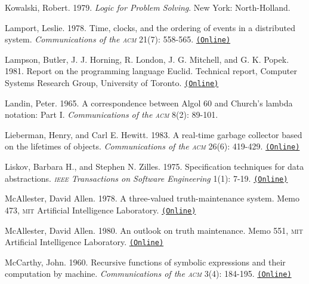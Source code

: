\documentclass[8pt,oneside]{book}
\newcommand{\acronym}[1]{\textsc{\MakeLowercase{#1}}}
\newcommand{\code}[1]{\texttt{#1}}
\begin{document}
Kowalski, Robert.  1979.  \textit{Logic for Problem Solving}. New York:
North-Holland.

 \label{Lamport (1978)}
Lamport, Leslie. 1978.  Time, clocks, and the ordering of events in a
distributed system.  \textit{Communications of the \acronym{ACM}} 21(7): 558-565.
\href{http://www.stanford.edu/class/cs240/readings/lamport.pdf}{\code{(Online)}}

 \label{Lampson et al. 1981}
Lampson, Butler, J. J. Horning, R.  London, J. G. Mitchell, and G. K.  Popek.
1981.  Report on the programming language Euclid.  Technical report, Computer
Systems Research Group, University of Toronto.
\href{http://www.bitsavers.org/pdf/xerox/parc/techReports/CSL-81-12_Report_On_The_Programming_Language_Euclid.pdf}{\code{(Online)}}

 \label{Landin (1965)}
Landin, Peter.  1965.  A correspondence between Algol 60 and Church's lambda
notation: Part I.  \textit{Communications of the \acronym{ACM}} 8(2): 89-101.

 \label{Lieberman and Hewitt 1983}
Lieberman, Henry, and Carl E. Hewitt. 1983. A real-time garbage collector based
on the lifetimes of objects. \textit{Communications of the \acronym{ACM}}
26(6): 419-429.
\href{http://dspace.mit.edu/handle/1721.1/6335}{\code{(Online)}}

 \label{Liskov and Zilles (1975)}
Liskov, Barbara H., and Stephen N. Zilles.  1975.  Specification techniques for
data abstractions.  \textit{\acronym{IEEE} Transactions on Software Engineering}
1(1): 7-19.
\href{http://csg.csail.mit.edu/CSGArchives/memos/Memo-117.pdf}{\code{(Online)}}

 \label{McAllester (1978; 1980)}
McAllester, David Allen.  1978.  A three-valued truth-maintenance system.  Memo
473, \acronym{MIT} Artificial Intelligence Laboratory.
\href{http://dspace.mit.edu/handle/1721.1/6296}{\code{(Online)}}

McAllester, David Allen.  1980.  An outlook on truth maintenance.  Memo 551,
\acronym{MIT} Artificial Intelligence Laboratory.
\href{http://dspace.mit.edu/handle/1721.1/6327}{\code{(Online)}}

 \label{McCarthy 1960}
McCarthy, John.  1960.  Recursive functions of symbolic expressions and their
computation by machine.  \textit{Communications of the \acronym{ACM}}
3(4): 184-195.
\href{http://innovation.it.uts.edu.au/projectjmc/articles/recursive.html}{\code{(Online)}}
\end{document}
